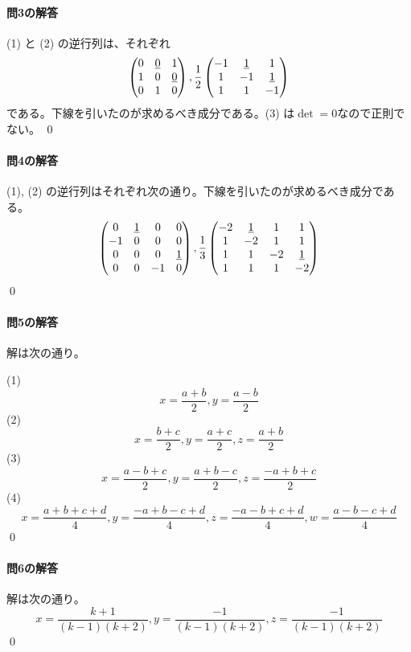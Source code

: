 \paragraph{問3の解答}
(1) と (2) の逆行列は、それぞれ
\[
\begin{pmatrix}
0 & \uline{0} & 1 \\
1 & 0 & \uline{0} \\
0 & 1 & 0
\end{pmatrix}, 
\frac{1}{2}
\begin{pmatrix}
-1 & \uline{1} & 1 \\
1 & -1 & \uline{1} \\
1 & 1 & -1
\end{pmatrix}
\]
である。下線を引いたのが求めるべき成分である。(3) は$\det = 0$なので正則でない。 \qed

\paragraph{問4の解答}
(1), (2) の逆行列はそれぞれ次の通り。下線を引いたのが求めるべき成分である。
\[
\begin{pmatrix}
0 & \uline{1} & 0 & 0 \\
-1 & 0 & 0 & 0 \\
0 & 0 & 0 & \uline{1} \\
0 & 0 & -1 & 0
\end{pmatrix}, 
\frac{1}{3}
\begin{pmatrix}
-2 & \uline{1} & 1 & 1 \\
1 & -2 & 1 & 1 \\
1 & 1 & -2 & \uline{1} \\
1 & 1 & 1 & -2
\end{pmatrix}
\]
\qed

\paragraph{問5の解答}
解は次の通り。

\noindent (1)
\[
x = \frac{a + b}{2}, y = \frac{a - b}{2}
\]
\noindent (2)
\[
x = \frac{b + c}{2}, y = \frac{a + c}{2}, z = \frac{a + b}{2}
\]
\noindent (3)
\[
x = \frac{a - b + c}{2}, y = \frac{a + b - c}{2}, z = \frac{-a + b + c}{2}
\]
\noindent (4)
\[
x = \frac{a + b + c + d}{4}, y = \frac{-a + b - c + d}{4}, z = \frac{-a - b + c + d}{4}, w = \frac{a - b - c + d}{4}
\]
\qed

\paragraph{問6の解答} 解は次の通り。
\[
x = \frac{k + 1}{(k - 1)(k + 2)}, y = \frac{-1}{(k - 1)(k + 2)}, z = \frac{-1}{(k - 1)(k + 2)}
\]
\qed

